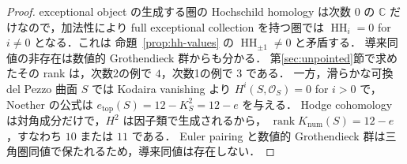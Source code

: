 \begin{proof}
exceptional object の生成する圏の Hochschild homology は次数 $0$ の
$\mathbb C$ だけなので，加法性により full exceptional collection を持つ圏では
$\operatorname{HH}_{i}=0$ for $i\ne0$ となる．これは
命題~\ref{prop:hh-values} の $\operatorname{HH}_{\pm1}\ne0$ と矛盾する．
導来同値の非存在は数値的 Grothendieck 群からも分かる．
第\ref{sec:unpointed}節で求めたその rank は，次数2の例で $4$，次数1の例で $3$ である．
一方，滑らかな可換 del Pezzo 曲面 $S$ では Kodaira vanishing より
$H^i(S,\mathcal O_S)=0$ for $i>0$ で，Noether の公式は
$e_{\mathrm{top}}(S)=12-K_S^2=12-e$ を与える．
Hodge cohomology は対角成分だけで，$H^2$ は因子類で生成されるから，
$\operatorname{rank}K_{\mathrm{num}}(S)=12-e$，すなわち $10$ または $11$ である．
Euler pairing と数値的 Grothendieck 群は三角圏同値で保たれるため，導来同値は存在しない．
\end{proof}


